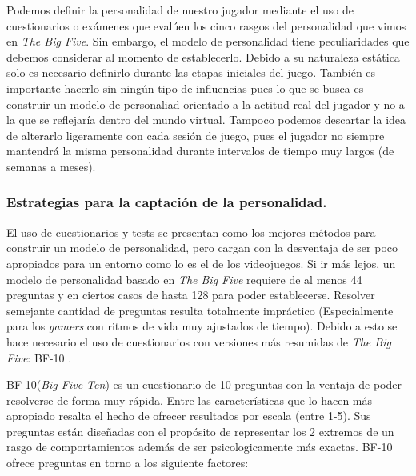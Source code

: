 \documentclass[conference]{IEEEtran}
\begin{document}
Podemos definir la personalidad de nuestro jugador mediante el uso de cuestionarios o exámenes que evalúen los cinco rasgos del personalidad que vimos en \textit{The Big Five}. Sin embargo, el modelo de personalidad tiene peculiaridades que debemos considerar al momento de establecerlo. Debido a su naturaleza estática solo es necesario definirlo durante las etapas iniciales del juego. También es importante hacerlo sin ningún tipo de influencias pues lo que se busca es construir un modelo de personaliad orientado a la actitud real del jugador y no a la que se reflejaría  dentro del mundo virtual. Tampoco podemos descartar la idea de alterarlo ligeramente con cada sesión de juego, pues el jugador no siempre mantendrá la misma personalidad durante intervalos de tiempo muy largos (de semanas a meses).

\subsubsection{Estrategias para la captación de la personalidad.}

El uso de cuestionarios y tests se presentan como los mejores métodos para construir un modelo de personalidad, pero cargan con la desventaja de ser poco apropiados para un entorno como lo es el de los videojuegos. Si ir más lejos, un modelo de personalidad basado en \textit{The Big Five} requiere de al menos 44 preguntas y en ciertos casos de hasta 128 para poder establecerse. Resolver semejante cantidad de preguntas resulta totalmente impráctico (Especialmente para los \textit{gamers} con ritmos de vida muy ajustados de tiempo). Debido a esto se hace necesario el uso de cuestionarios con versiones más resumidas de \textit{The Big Five}: BF-10 \citep{rammstedt2007measuring}.

BF-10(\textit{Big Five Ten}) es un cuestionario de 10 preguntas con la ventaja de poder resolverse de forma muy rápida. Entre las características que lo hacen más apropiado resalta el hecho de ofrecer resultados por escala (entre 1-5). Sus preguntas están diseñadas con el propósito de representar los 2 extremos de un rasgo de comportamientos además de ser psicologicamente más exactas. BF-10 ofrece preguntas en torno a los siguiente factores:
\end{document}
